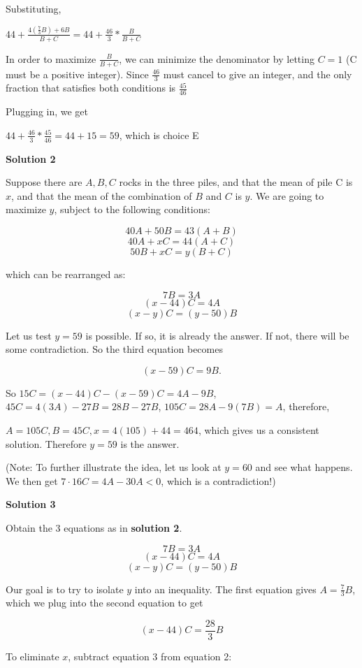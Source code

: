 \begin{enumerate}
 Substituting,

 $44 + \frac{4(\frac{7}{3}B) + 6B}{B + C}=44 + \frac{46}{3}*\frac{B}{B + C}$

 In order to maximize $\frac{B}{B + C}$, we can minimize the denominator by letting $C = 1$ (C must be a positive integer). Since $\frac{46}{3}$ must cancel to give an integer, and the only fraction that satisfies both conditions is $\frac{45}{46}$

 Plugging in, we get

 $44 + \frac{46}{3} * \frac{45}{46} = 44 + 15 = 59$, which is choice E

 



\textbf{Solution 2}

Suppose there are $A,B,C$ rocks in the three piles, and that the mean of pile C is $x$, and that the mean of the combination of $B$ and $C$ is $y$. We are going to maximize $y$, subject to the following conditions:

 
 \[40A+50B=43(A+B)\]
 \[40A+xC=44(A+C)\]
 \[50B+xC=y(B+C)\]

 which can be rearranged as:

 
 \[7B=3A\]
 \[(x-44)C=4A\]
 \[(x-y)C=(y-50)B\]

 Let us test $y=59$ is possible. If so, it is already the answer. If not, there will be some contradiction. So the third equation becomes 

 
 \[(x-59)C=9B.\]

 So $15C = (x-44)C - (x-59)C = 4A - 9B$, $45C=4(3A)-27B=28B-27B$, $105C=28A-9(7B)=A$, therefore,

 $A=105C, B=45C, x=4(105)+44=464$, which gives us a consistent solution. Therefore $y=59$ is the answer.

 (Note: To further illustrate the idea, let us look at $y=60$ and see what happens. We then get $7\cdot 16C = 4A-30A<0$, which is a contradiction!)

 



\textbf{Solution 3}

Obtain the 3 equations as in \textbf{solution 2}.

 
 \[7B=3A\]
 \[(x-44)C=4A\]
 \[(x-y)C=(y-50)B\]

 Our goal is to try to isolate $y$ into an inequality. The first equation gives $A=\frac{7}{3}B$, which we plug into the second equation to get

 
 \[(x-44)C=\frac{28}{3}B\]

 To eliminate $x$, subtract equation 3 from equation 2:


\end{enumerate}
